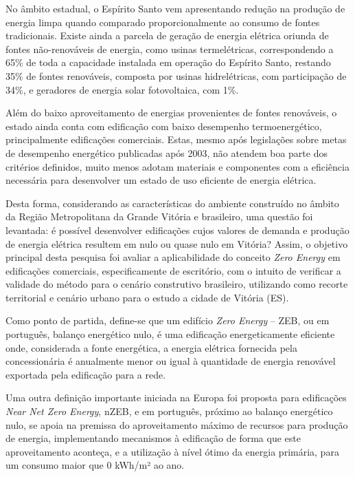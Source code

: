 \begin{onehalfspace}
    \noindent No âmbito estadual, o Espírito Santo vem apresentando redução na produção 
    de energia limpa quando comparado proporcionalmente ao consumo de fontes tradicionais. 
    Existe ainda a parcela de geração de energia elétrica oriunda de fontes não-renováveis 
    de energia, como usinas termelétricas, correspondendo a 65\% de toda a capacidade 
    instalada em operação do Espírito Santo, restando 35\% de fontes renováveis, composta 
    por usinas hidrelétricas, com participação de 34\%, e geradores de energia solar 
    fotovoltaica, com 1\%.\vspace*{0.3cm}

    \noindent Além do baixo aproveitamento de energias provenientes de fontes 
    renováveis, o estado ainda conta com edificação com baixo desempenho termoenergético, 
    principalmente edificações comerciais. Estas, mesmo após legislações sobre metas de 
    desempenho energético publicadas após 2003, não atendem boa parte dos critérios 
    definidos, muito menos adotam materiais e componentes com a eficiência necessária 
    para desenvolver um estado de uso eficiente de energia elétrica.\vspace*{0.3cm}

    \noindent Desta forma, considerando as características do ambiente construído no 
    âmbito da Região Metropolitana da Grande Vitória e brasileiro, uma questão foi 
    levantada: é possível desenvolver edificações cujos valores de demanda e produção de 
    energia elétrica resultem em nulo ou quase nulo em Vitória? Assim, o objetivo 
    principal desta pesquisa foi avaliar a aplicabilidade do conceito \textit{Zero Energy}
    em edificações comerciais, especificamente de escritório, com o intuito de 
    verificar a validade do método para o cenário construtivo brasileiro, utilizando 
    como recorte territorial e cenário urbano para o estudo a cidade de 
    Vitória (ES).\vspace*{0.3cm}

    \noindent Como ponto de partida, define-se que um edifício \textit{Zero Energy} – ZEB, 
    ou em português, balanço energético nulo, é uma edificação energeticamente eficiente 
    onde, considerada a fonte energética, a energia elétrica fornecida pela concessionária 
    é anualmente menor ou igual à quantidade de energia renovável exportada pela 
    edificação para a rede.\vspace*{0.3cm}

    \noindent Uma outra definição importante iniciada na Europa foi proposta para 
    edificações \textit{Near Net Zero Energy}, nZEB, e em português, próximo ao 
    balanço energético nulo, se apoia na premissa do aproveitamento máximo 
    de recursos para produção de energia, implementando mecanismos à edificação de 
    forma que este aproveitamento aconteça, e a utilização à nível ótimo da energia 
    primária, para um consumo maior que 0 kWh/m² ao ano.\vspace*{0.3cm}


\end{onehalfspace}
